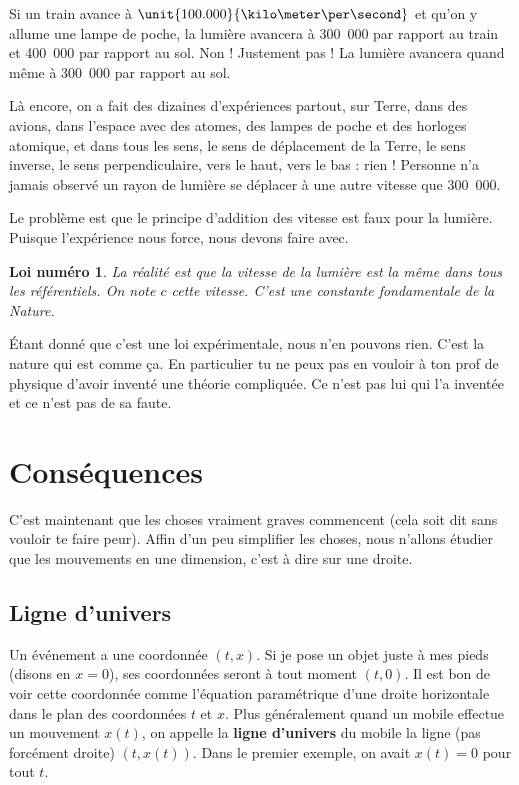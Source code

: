 \documentclass[a4paper,12pt]{book}
\newcounter{numloiphyz}
\theoremstyle{mes_exemples}	\newtheorem{exemple}[numtho]{Exemple}
\theoremstyle{mes_tho}
\newtheorem{loiphyz}[numloiphyz]{Loi numéro}
\newcommand{\defe}[2]{\textbf{#1}\index{#2}}
\begin{document}
Si un train avance à $\unit{100.000}{\kilo\meter\per\second}$ et qu'on y allume une lampe de poche, la lumière avancera à \unit{300.000}{\kilo\meter\per\second} par rapport au train et \unit{400.000}{\kilo\meter\per\second} par rapport au sol. Non ! Justement pas ! La lumière avancera quand même à \unit{300.000}{\kilo\meter\per\second} par rapport au sol.

Là encore, on a fait des dizaines d'expériences partout, sur Terre, dans des avions, dans l'espace avec des atomes, des lampes de poche et des horloges atomique, et dans tous les sens, le sens de déplacement de la Terre, le sens inverse, le sens perpendiculaire, vers le haut, vers le bas : rien ! Personne n'a jamais observé un rayon de lumière se déplacer à une autre vitesse que \unit{300.000}{\kilo\meter\per\second}.

Le problème est que le principe d'addition des vitesse est faux pour la lumière. Puisque l'expérience nous force, nous devons faire avec. 

\begin{loiphyz}		\label{LoiVitLum}
La réalité est que la vitesse de la lumière est la même dans tous les référentiels. On note $c$ cette vitesse. C'est une constante fondamentale de la Nature.
\end{loiphyz}
Étant donné que c'est une loi expérimentale, nous n'en pouvons rien. C'est la nature qui est comme ça. En particulier tu ne peux pas en vouloir à ton prof de physique d'avoir inventé une théorie compliquée. Ce n'est pas lui qui l'a inventée et ce n'est pas de sa faute.


\section{Conséquences}

C'est maintenant que les choses vraiment graves commencent (cela soit dit sans vouloir te faire peur). Affin d'un peu simplifier les choses, nous n'allons  étudier que les mouvements en une dimension, c'est à dire sur une droite.

\subsection{Ligne d'univers}

Un événement a une coordonnée $(t,x)$. Si je pose un objet juste à mes pieds (disons en $x=0$), ses coordonnées seront à tout moment $(t,0)$. Il est bon de voir cette coordonnée comme l'équation paramétrique d'une droite horizontale dans le plan des coordonnées $t$ et $x$. Plus généralement quand un mobile effectue un mouvement $x(t)$, on appelle la \defe{ligne d'univers}{Ligne d'univers} du mobile la ligne (pas forcément droite) $(t,x(t))$. Dans le premier exemple, on avait $x(t)=0$ pour tout $t$.
\end{document}
